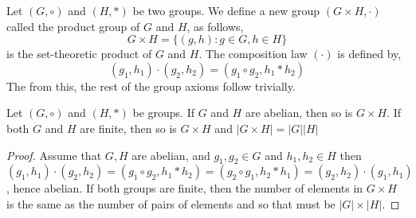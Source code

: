 \begin{ndefi}
  Let $(G, \circ)$ and $(H, *)$ be two groups. We define a new group $(G \times H, \cdot)$ called the product group of $G$ and $H$, as follows,
  $$ G \times H = \{(g, h) : g \in G, h \in H\} $$
  is the set-theoretic product of $G$ and $H$. The composition law $(\cdot)$ is defined by,
  $$ (g_1, h_1) \cdot (g_2, h_2) = (g_1 \circ g_2, h_1 * h_2) $$
  The from this, the rest of the group axioms follow trivially.
\end{ndefi}

\begin{nlemma}
  Let $(G, \circ)$ and $(H, *)$ be groups. If $G$ and $H$ are abelian, then so is $G \times H$. If both $G$ and $H$ are finite, then so is $G \times H$ and $|G \times H| = |G||H|$
\end{nlemma}

\begin{proof}
  Assume that $G, H$ are abelian, and $g_1, g_2 \in G$ and $h_1, h_2 \in H$ then
  $(g_1, h_1) \cdot (g_2, h_2) = (g_1 \circ g_2, h_1 * h_2) = (g_2 \circ g_1, h_2 * h_1) = (g_2, h_2) \cdot (g_1, h_1)$, hence abelian. If both groups are finite, then the number of elements in $G \times H$ is the same as the number of pairs of elements and so that must be $|G| \times |H|$.
\end{proof}
